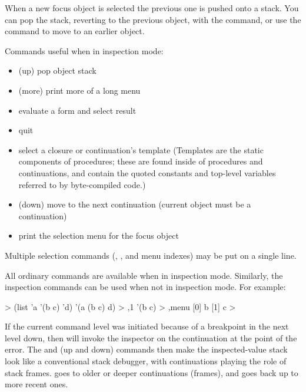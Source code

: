 When a new focus object is selected the previous one is pushed onto a
 stack.
You can pop the stack, reverting to the previous object, with
 the  command, or use the  command to move to
 an earlier object.

%

Commands useful when in inspection mode:
\begin{itemize}
\item{} (up) pop object stack
\item{} (more) print more of a long menu
\item\code{(\ldots)} evaluate a form and select result
\item{} quit
\item{} select a closure or continuation's template
 (Templates are the static components of procedures; these are found
  inside of procedures and continuations, and contain the quoted
  constants and top-level variables referred to by byte-compiled code.)
\item{} (down) move to the next continuation
 (current object must be a continuation)
\item{} print the selection menu for the focus object
\end{itemize}

Multiple selection commands (, , and menu indexes)
 may be put on a single line.


All ordinary commands are available when in inspection mode.
Similarly, the inspection commands can be used when not in inspection
 mode.
For example:
\begin{example}
> (list 'a '(b c) 'd)
'(a (b c) d)
> ,1
'(b c)
> ,menu
[0] b
[1] c
> 
\end{example}

If the current command level was initiated because of
 a breakpoint in the next level down, then 
  will invoke the inspector on the
 continuation at the point of the error.
The  and  (up and down)
commands then make the inspected-value stack look like a conventional stack
debugger, with continuations playing the role of stack frames.   goes
to older or deeper continuations (frames), and  goes back up to more
recent ones.

